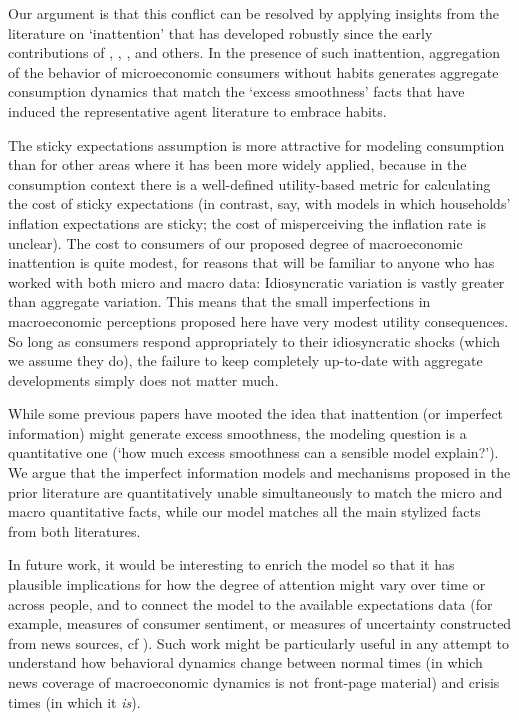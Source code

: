 \documentclass[titlepage]{\econtex}\newcommand{\texname}{cAndCwithStickyE}
\begin{document}
Our argument is that this conflict can be resolved by applying insights from the literature on `inattention' that has developed robustly since the early contributions of \cite{simsInattention}, \cite{woodfordImperfect}, \cite{mrSlumps}, and others.  In the presence of such inattention, aggregation of the behavior of microeconomic consumers without habits generates aggregate consumption dynamics that match the `excess smoothness' facts that have induced the representative agent literature to embrace habits.

The sticky expectations assumption is more attractive for modeling consumption than for other areas where it has been more widely applied, because in the consumption context there is a well-defined utility-based metric for calculating the cost of sticky expectations (in contrast, say, with models in which households' inflation expectations are sticky; the cost of misperceiving the inflation rate is unclear).  The cost to consumers of our proposed degree of macroeconomic inattention is quite modest, for reasons that will be familiar to anyone who has worked with both micro and macro data: Idiosyncratic variation is vastly greater than aggregate variation.  This means that the small imperfections in macroeconomic perceptions proposed here have very modest utility consequences.  So long as consumers respond appropriately to their idiosyncratic shocks (which we assume they do), the failure to keep completely up-to-date with aggregate developments simply does not matter much.

While some previous papers have mooted the idea that inattention (or imperfect information) might generate excess smoothness, the modeling question is a quantitative one (`how much excess smoothness can a sensible model explain?').  We argue that the imperfect information models and mechanisms proposed in the prior literature are quantitatively unable simultaneously to match the micro and macro quantitative facts, while our model matches all the main stylized facts from both literatures.

In future work, it would be interesting to enrich the model so that it has plausible implications for how the degree of attention might vary over time or across people, and to connect the model to the available expectations data (for example, measures of consumer sentiment, or measures of uncertainty constructed from news sources, cf \cite{bbdUncertainty}).  Such work might be particularly useful in any attempt to understand how behavioral dynamics change between normal times (in which news coverage of macroeconomic dynamics is not front-page material) and crisis times (in which it {\it is}).
\end{document}
